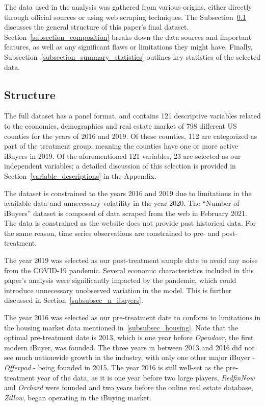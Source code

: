 ﻿The data used in the analysis was gathered from various origins, either directly through official sources or using web scraping techniques. The Subsection~\ref{subsection_structure} discusses the general structure of this paper’s final dataset. Section~\ref{subsection_composition} breaks down the data sources and important features, as well as any significant flaws or limitations they might have. Finally, Subsection~\ref{subsection_summary_statistics} outlines key statistics of the selected data. 

\subsection{Structure}\label{subsection_structure}
The full dataset has a panel format, and contains 121 descriptive variables related to the economics, demographics and real estate market of 798 different US counties for the years of 2016 and 2019. Of these counties, 112 are categorized as part of the treatment group, meaning the counties have one or more active iBuyers in 2019. Of the aforementioned 121 variables, 23 are selected as our independent variables; a detailed discussion of this selection is provided in Section~\ref{variable_descriptions} in the Appendix.

The dataset is constrained to the years 2016 and 2019 due to limitations in the available data and unnecessary volatility in the year 2020. The “Number of iBuyers” dataset is composed of data scraped from the web in February 2021. The data is constrained as the website does not provide past historical data. For the same reason, time series observations are constrained to pre- and post-treatment.  

The year 2019 was selected as our post-treatment sample date to avoid any noise from the COVID-19 pandemic. Several economic characteristics included in this paper’s analysis were significantly impacted by the pandemic, which could introduce unnecessary unobserved variation in the model. This is further discussed in Section~\ref{subsubsec_n_ibuyers}.

The year 2016 was selected as our pre-treatment date to conform to limitations in  the housing market data mentioned in~\ref{subsubsec_housing}. Note that the optimal pre-treatment date is 2013, which is one year before \textit{Opendoor}, the first modern iBuyer, was founded. The three years in between 2013 and 2016 did not see much nationwide growth in the industry, with only one other major iBuyer - \textit{Offerpad} - being founded in 2015. The year 2016 is still well-set as the pre-treatment year of the data, as it is one year before two large players, \textit{RedfinNow} and \textit{Orchard} were founded and two years before the online real estate database, \textit{Zillow}, began operating in the iBuying market.


